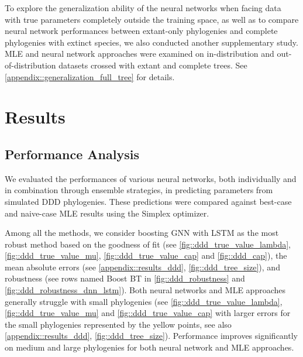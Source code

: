 {To explore the generalization ability of the neural networks when facing data with true parameters completely outside the training space, as well as to compare neural network performances between extant-only phylogenies and complete phylogenies with extinct species, we also conducted another supplementary study. MLE and neural network approaches were examined on in-distribution and out-of-distribution datasets crossed with extant and complete trees. See \autoref{appendix::generalization_full_tree} for details.

\section{Results}
\label{ch2::sec::results}
\subsection{Performance Analysis}
\label{ch2::sec::results::compare_performance}
We evaluated the performances of various neural networks, both individually and in combination through ensemble strategies, in predicting parameters from simulated DDD phylogenies. These predictions were compared against best-case and naive-case MLE results using the Simplex optimizer.

Among all the methods, we consider boosting GNN with LSTM as the most robust method based on the goodness of fit (see \autoref{fig::ddd_true_value_lambda}, \autoref{fig::ddd_true_value_mu}, \autoref{fig::ddd_true_value_cap} and \autoref{fig::ddd_cap}), the mean absolute errors (see \autoref{appendix::results_ddd}, \autoref{fig::ddd_tree_size}), and robustness (see rows named Boost BT in \autoref{fig::ddd_robustness} and \autoref{fig::ddd_robustness_dnn_lstm}). Both neural networks and MLE approaches generally struggle with small phylogenies (see \autoref{fig::ddd_true_value_lambda}, \autoref{fig::ddd_true_value_mu} and \autoref{fig::ddd_true_value_cap} with larger errors for the small phylogenies represented by the yellow points, see also \autoref{appendix::results_ddd}, \autoref{fig::ddd_tree_size}). Performance improves significantly on medium and large phylogenies for both neural network and MLE approaches. 

}
